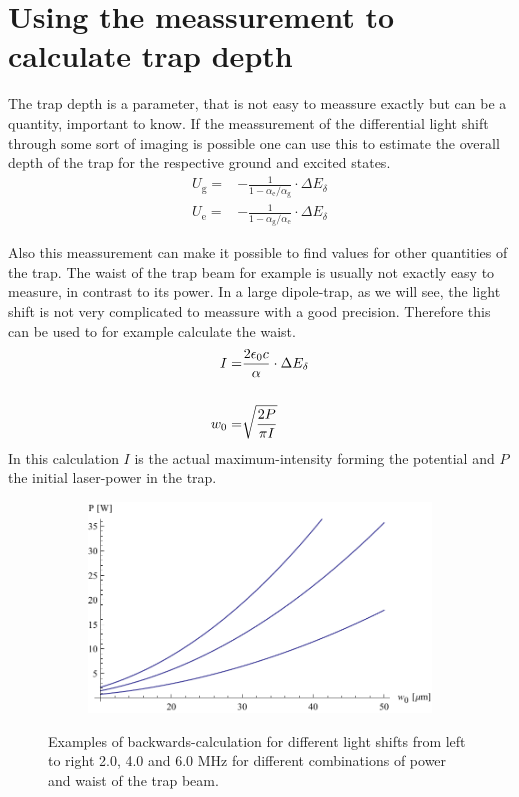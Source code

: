 \section{Using the meassurement to calculate trap depth}

The trap depth is a parameter, that is not easy to meassure exactly but can be a quantity, important to know. If the meassurement of the differential light shift through some sort of imaging is possible one can use this to estimate the overall depth of the trap for the respective ground and excited states.
\begin{align}
U_{\mathrm{g}}=&-\frac{1}{1-\alpha_{\mathrm{e}}/\alpha_{\mathrm{g}}}\cdot \Delta E_\delta\\
U_{\mathrm{e}}=&-\frac{1}{1-\alpha_{\mathrm{g}}/\alpha_{\mathrm{e}}}\cdot \Delta E_\delta
\end{align}

Also this meassurement can make it possible to find values for other quantities of the trap. The waist of the trap beam for example is usually not exactly easy to measure, in contrast to its power. In a large dipole-trap, as we will see, the light shift is not very complicated to meassure with a good precision. Therefore this can be used to for example calculate the waist.
\begin{align}
I=&\frac{2\epsilon_0 c}{\alpha}\cdot \Delta E_\delta\\\notag\\
w_0=&\sqrt{\frac{2P}{\pi I}}
\end{align}
In this calculation $I$ is the actual maximum-intensity forming the potential and $P$ the initial laser-power in the trap.
\begin{figure}[H]
\centering
\begin{subfigure}[b]{0.6\textwidth}
                \includegraphics[width=\textwidth]{bachwards}
\end{subfigure}
\caption{Examples of backwards-calculation for different light shifts from left to right 2.0, 4.0 and 6.0 MHz for different combinations of power and waist of the trap beam.}
\label{backwards}
\end{figure}